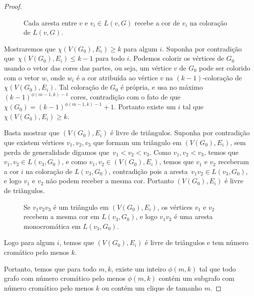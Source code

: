 \begin{proof}
\begin{figure}[H]
\begin{tikzpicture}[-latex ,auto ,node distance =0.7cm and 5cm, on grid,semithick ,state/.style ={circle, draw, text=white , minimum width =0.2 cm}]
\end{tikzpicture}
\caption{Cada aresta entre $v$ e $v_i\in L(v,G)$ recebe a cor de $v_i$ na coloração de $L(v,G)$.}
\label{fig:trianglefree-edgecolor}
\end{figure}

Mostraremos que $\chi(V(G_0),E_i) \geq k$ para algum $i$. Suponha por contradição que~$\chi(V(G_0),E_i) \leq k-1$ para todo $i$. Podemos colorir os vértices de $G_0$ usando o vetor das cores das partes, ou seja, um vértice $v$ de $G_0$ pode ser colorido com o vetor $w$, onde $w_i$ é a cor atribuída ao vértice $v$ na $(k-1)$-coloração de $\chi(V(G_0),E_i)$. Tal coloração de $G_0$ é própria, e usa no máximo $(k-1)^{\phi(m-1,k)-1}$ cores, contradição com o fato de que $\chi(G_0) = (k-1)^{\phi(m-1,k)-1}+1$. Portanto existe um $i$ tal que $\chi(V(G_0), E_i) \geq k$.

Basta mostrar que $(V(G_0),E_i)$ é livre de triângulos. Suponha por contradição que existem vértices $v_1,v_2,v_3$ que formam um triângulo em $(V(G_0),E_i)$, sem perda de generalidade digamos que~$v_1 < v_2 < v_3$. Como $v_1,v_2 < v_3$, temos que $v_1,v_2\in L(v_3, G_0)$, e como $v_1,v_2 \in (V(G_0),E_i)$, temos que $v_1$ e $v_2$ receberam a cor $i$ na coloração de $L(v_3, G_0)$, contradição pois a aresta~$v_1v_2 \in L(v_3, G_0)$, e logo $v_1$ e $v_2$ não podem receber a mesma cor. Portanto $(V(G_0),E_i)$ é livre de triângulos.

\begin{figure}[H]
\centering
{}
\caption{Se $v_1v_2v_3$ é um triângulo em $(V(G_0),E_i)$, os vértices $v_1$ e $v_2$ recebem a mesma cor em $L(v_3, G_0)$, e logo $v_1v_2$ é uma aresta monocromática em $L(v_3, G_0)$.}
\label{fig:trianglefree-trianglefree}
\end{figure}

Logo para algum $i$, temos que $(V(G_0), E_i)$ é livre de triângulos e tem número cromático pelo menos $k$.

Portanto, temos que para todo $m,k$, existe um inteiro $\phi(m,k)$ tal que todo grafo com número cromático pelo menos $\phi(m,k)$ contém um subgrafo com número cromático pelo menos $k$ ou contém um clique de tamanho $m$.
\end{proof}

